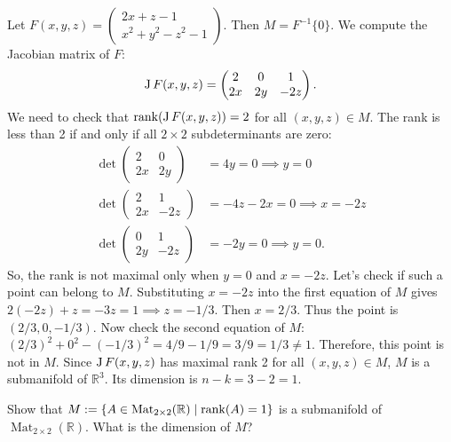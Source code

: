 \begin{exercisesolution}
Let $F(x,y,z) = \begin{pmatrix} 2x+z-1 \\ x^2+y^2-z^2-1 \end{pmatrix}$. Then $M = F^{-1}\{0\}$.
We compute the Jacobian matrix of $F$:
\[ \operatorname{J} F(x,y,z) = \begin{pmatrix} 2 & 0 & 1 \\ 2x & 2y & -2z \end{pmatrix}. \]
We need to check that $\operatorname{rank}(\operatorname{J} F(x,y,z)) = 2$ for all $(x,y,z) \in M$.
The rank is less than 2 if and only if all $2 \times 2$ subdeterminants are zero:
\begin{align*}
\det \begin{pmatrix} 2 & 0 \\ 2x & 2y \end{pmatrix} &= 4y = 0 \implies y = 0 \\
\det \begin{pmatrix} 2 & 1 \\ 2x & -2z \end{pmatrix} &= -4z - 2x = 0 \implies x = -2z \\
\det \begin{pmatrix} 0 & 1 \\ 2y & -2z \end{pmatrix} &= -2y = 0 \implies y = 0.
\end{align*}
So, the rank is not maximal only when $y=0$ and $x=-2z$.
Let's check if such a point can belong to $M$. Substituting $x=-2z$ into the first equation of $M$ gives $2(-2z) + z = -3z = 1 \implies z = -1/3$.
Then $x = 2/3$. Thus the point is $(2/3, 0, -1/3)$.
Now check the second equation of $M$: $(2/3)^2 + 0^2 - (-1/3)^2 = 4/9 - 1/9 = 3/9 = 1/3 \neq 1$.
Therefore, this point is not in $M$.
Since $\operatorname{J} F(x,y,z)$ has maximal rank 2 for all $(x,y,z) \in M$, $M$ is a submanifold of $\mathbb{R}^3$.
Its dimension is $n - k = 3 - 2 = 1$.
\end{exercisesolution}

\begin{exercise}
\label{ex:submanifold_matrices_rank1}
Show that $M := \{ A \in \operatorname{Mat}_{2\times 2}(\mathbb{R}) \mid \operatorname{rank}(A) = 1 \}$ is a submanifold of $\operatorname{Mat}_{2\times 2}(\mathbb{R})$. What is the dimension of $M$?
\end{exercise}

